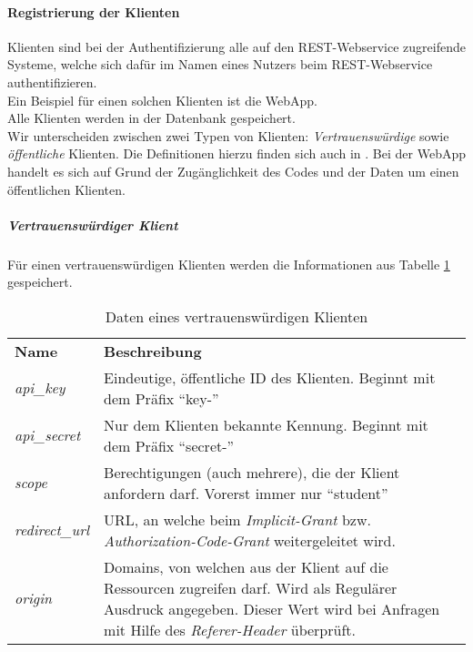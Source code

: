 \paragraph{Registrierung der Klienten}
Klienten sind bei der Authentifizierung alle auf den REST-Webservice zugreifende Systeme, welche sich dafür im Namen eines Nutzers beim REST-Webservice authentifizieren.\\
Ein Beispiel für einen solchen Klienten ist die WebApp.\\
Alle Klienten werden in der Datenbank gespeichert.\\
Wir unterscheiden zwischen zwei Typen von Klienten: \textit{Vertrauenswürdige} sowie \textit{öffentliche} Klienten. Die Definitionen hierzu finden sich auch in \cite[Kap. 2.1]{rfc6749}. Bei der WebApp handelt es sich auf Grund der Zugänglichkeit des Codes und der Daten um einen öffentlichen Klienten.
\subparagraph{Vertrauenswürdiger Klient}
Für einen vertrauenswürdigen Klienten werden die Informationen aus Tabelle \ref{tab:api-auth-confidential-client-data} gespeichert.\\
\begin{table}
	\begin{tabular}{@{} | p{} | p{} | @{}} 
		\hline
		\textbf{Name} & \textbf{Beschreibung}\\ \hhline{|=|=|}
		\textit{api\_key} & Eindeutige, öffentliche ID des Klienten. Beginnt mit dem Präfix \enquote{key-} \\ \hline
		\textit{api\_secret} & Nur dem Klienten bekannte Kennung. Beginnt mit dem Präfix \enquote{secret-} \\ \hline
		\textit{scope} & Berechtigungen (auch mehrere), die der Klient anfordern darf. Vorerst immer nur \enquote{student} \\ \hline
		\textit{redirect\_url} & URL, an welche beim \textit{Implicit-Grant} bzw. \textit{Authorization-Code-Grant} weitergeleitet wird. \\ \hline
		\textit{origin} & Domains, von welchen aus der Klient auf die Ressourcen zugreifen darf. Wird als Regulärer Ausdruck angegeben. Dieser Wert wird bei Anfragen mit Hilfe des \textit{Referer-Header} überprüft. \\
		\hline
	\end{tabular}
	\caption{Daten eines vertrauenswürdigen Klienten}
	\label{tab:api-auth-confidential-client-data}
\end{table}

